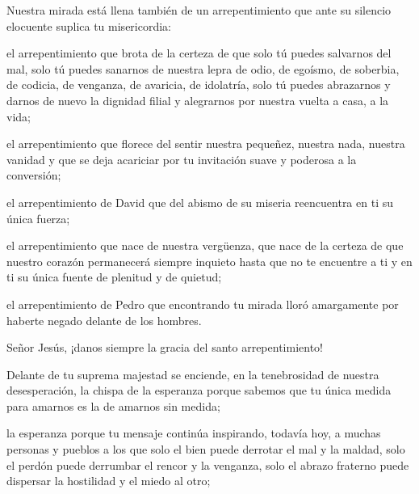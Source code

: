 			\begin{body}Nuestra mirada está llena también de un arrepentimiento que ante su silencio elocuente suplica tu misericordia:\end{body}
			
			\begin{body}el arrepentimiento que brota de la certeza de que solo tú puedes salvarnos del mal, solo tú puedes sanarnos de nuestra lepra de odio, de egoísmo, de soberbia, de codicia, de venganza, de avaricia, de idolatría, solo tú puedes abrazarnos y darnos de nuevo la dignidad filial y alegrarnos por nuestra vuelta a casa, a la vida; \end{body}
			
			\begin{body}el arrepentimiento que florece del sentir nuestra pequeñez, nuestra nada, nuestra vanidad y que se deja acariciar por tu invitación suave y poderosa a la conversión; \end{body}
			
			\begin{body}el arrepentimiento de David que del abismo de su miseria reencuentra en ti su única fuerza; \end{body}
			
			\begin{body}el arrepentimiento que nace de nuestra vergüenza, que nace de la certeza de que nuestro corazón permanecerá siempre inquieto hasta que no te encuentre a ti y en ti su única fuente de plenitud y de quietud; \end{body}
			
			\begin{body}el arrepentimiento de Pedro que encontrando tu mirada lloró amargamente por haberte negado delante de los hombres. \end{body}
			
			\begin{body}Señor Jesús, ¡danos siempre la gracia del santo arrepentimiento! \end{body}
			
			\begin{body}Delante de tu suprema majestad se enciende, en la tenebrosidad de nuestra desesperación, la chispa de la esperanza porque sabemos que tu única medida para amarnos es la de amarnos sin medida; \end{body}
			
			\begin{body}la esperanza porque tu mensaje continúa inspirando, todavía hoy, a muchas personas y pueblos a los que solo el bien puede derrotar el mal y la maldad, solo el perdón puede derrumbar el rencor y la venganza, solo el abrazo fraterno puede dispersar la hostilidad y el miedo al otro; \end{body}
			
